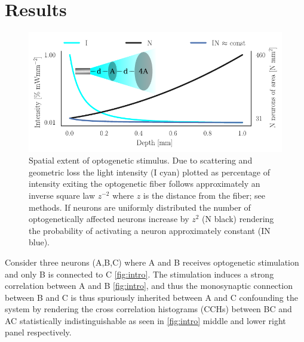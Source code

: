 \documentclass[11pt]{article}
\begin{document}
\section{Results}
\begin{figure}\includegraphics[scale=1]{opto-powerlaw}
\caption{Spatial extent of optogenetic stimulus. Due to scattering and geometric loss the light intensity (I cyan) plotted as percentage of intensity exiting the optogenetic fiber follows approximately an inverse square law $ z^{-2} $ where $ z $ is the distance from the fiber; see methods. If neurons are uniformly distributed the number of optogenetically affected neurons increase by $ z^{2} $ (N black) rendering the probability of activating a neuron approximately constant (IN blue). \label{fig:concept}}
\end{figure}
Consider three neurons (A,B,C) where A and B receives optogenetic stimulation and only B is connected to C \cref{fig:intro}. The stimulation induces a strong correlation between A and B \cref{fig:intro}, and thus the monosynaptic connection between B and C is thus spuriously inherited between A and C confounding the system by rendering the cross correlation histograms (CCHs) between BC and AC statistically indistinguishable as seen in \cref{fig:intro} middle and lower right panel respectively.
\end{document}
